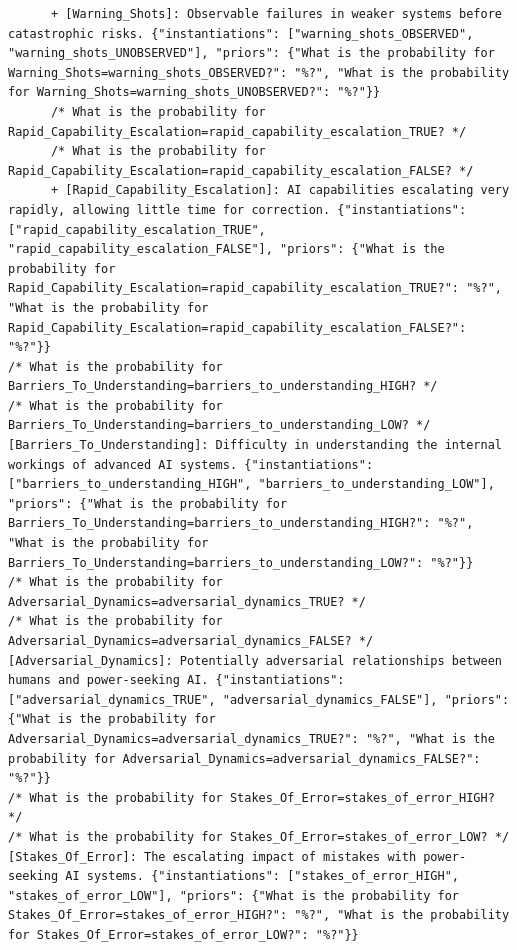 \documentclass[
  11pt,
  letterpaper,
]{book}
\begin{document}
\begin{verbatim}
      + [Warning_Shots]: Observable failures in weaker systems before catastrophic risks. {"instantiations": ["warning_shots_OBSERVED", "warning_shots_UNOBSERVED"], "priors": {"What is the probability for Warning_Shots=warning_shots_OBSERVED?": "%?", "What is the probability for Warning_Shots=warning_shots_UNOBSERVED?": "%?"}}
      /* What is the probability for Rapid_Capability_Escalation=rapid_capability_escalation_TRUE? */
      /* What is the probability for Rapid_Capability_Escalation=rapid_capability_escalation_FALSE? */
      + [Rapid_Capability_Escalation]: AI capabilities escalating very rapidly, allowing little time for correction. {"instantiations": ["rapid_capability_escalation_TRUE", "rapid_capability_escalation_FALSE"], "priors": {"What is the probability for Rapid_Capability_Escalation=rapid_capability_escalation_TRUE?": "%?", "What is the probability for Rapid_Capability_Escalation=rapid_capability_escalation_FALSE?": "%?"}}
/* What is the probability for Barriers_To_Understanding=barriers_to_understanding_HIGH? */
/* What is the probability for Barriers_To_Understanding=barriers_to_understanding_LOW? */
[Barriers_To_Understanding]: Difficulty in understanding the internal workings of advanced AI systems. {"instantiations": ["barriers_to_understanding_HIGH", "barriers_to_understanding_LOW"], "priors": {"What is the probability for Barriers_To_Understanding=barriers_to_understanding_HIGH?": "%?", "What is the probability for Barriers_To_Understanding=barriers_to_understanding_LOW?": "%?"}}
/* What is the probability for Adversarial_Dynamics=adversarial_dynamics_TRUE? */
/* What is the probability for Adversarial_Dynamics=adversarial_dynamics_FALSE? */
[Adversarial_Dynamics]: Potentially adversarial relationships between humans and power-seeking AI. {"instantiations": ["adversarial_dynamics_TRUE", "adversarial_dynamics_FALSE"], "priors": {"What is the probability for Adversarial_Dynamics=adversarial_dynamics_TRUE?": "%?", "What is the probability for Adversarial_Dynamics=adversarial_dynamics_FALSE?": "%?"}}
/* What is the probability for Stakes_Of_Error=stakes_of_error_HIGH? */
/* What is the probability for Stakes_Of_Error=stakes_of_error_LOW? */
[Stakes_Of_Error]: The escalating impact of mistakes with power-seeking AI systems. {"instantiations": ["stakes_of_error_HIGH", "stakes_of_error_LOW"], "priors": {"What is the probability for Stakes_Of_Error=stakes_of_error_HIGH?": "%?", "What is the probability for Stakes_Of_Error=stakes_of_error_LOW?": "%?"}}
\end{verbatim}
\end{document}
